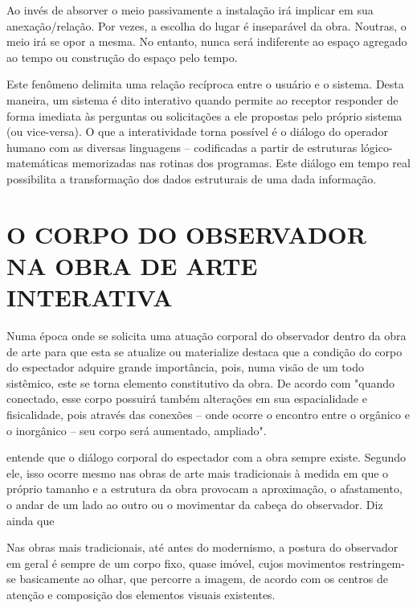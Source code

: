 Ao invés de absorver o meio passivamente a instalação irá implicar em sua anexação/relação.
Por vezes, a escolha do lugar é inseparável da obra. Noutras, o meio
irá se opor a mesma. No entanto, nunca será indiferente ao espaço agregado ao
tempo ou construção do espaço pelo tempo. \cite[p. 1130]{semeler2015}



Este fenômeno delimita uma relação recíproca entre o usuário e o sistema. Desta
maneira, um sistema é dito interativo quando permite ao receptor responder de forma
imediata às perguntas ou solicitações a ele propostas pelo próprio sistema (ou vice-versa). O que a interatividade torna possível é o diálogo do operador humano com as diversas linguagens – codificadas a partir de estruturas lógico-matemáticas memorizadas nas rotinas dos programas. Este diálogo em tempo real possibilita a transformação dos dados estruturais de uma dada informação. \cite{tavares}


\section{O CORPO DO OBSERVADOR NA OBRA DE ARTE INTERATIVA}
	
Numa época onde se solicita uma atuação corporal do observador dentro da obra de arte para que esta se atualize ou materialize  destaca que a condição do corpo do espectador adquire grande importância, pois, numa visão de um todo sistêmico, este se torna elemento constitutivo da obra. De acordo com  "quando conectado, esse corpo possuirá também alterações em sua espacialidade e fisicalidade, pois através das conexões – onde ocorre o encontro entre o orgânico e o inorgânico – seu corpo será aumentado, ampliado".
	
 entende que o diálogo corporal do espectador com a obra sempre existe. Segundo ele, isso ocorre mesmo nas obras de arte mais tradicionais à medida em que o próprio tamanho e a estrutura da obra provocam a aproximação, o afastamento, o andar de um lado ao outro ou o movimentar da cabeça do observador. Diz ainda que

\begin{citacao}
Nas obras mais tradicionais, até antes do modernismo, a postura do observador em geral é sempre de um corpo fixo, quase imóvel, cujos movimentos restringem-se basicamente ao olhar, que percorre a imagem, de acordo com os centros de atenção e composição dos elementos visuais existentes. \cite{sogabe} 
\end{citacao}

